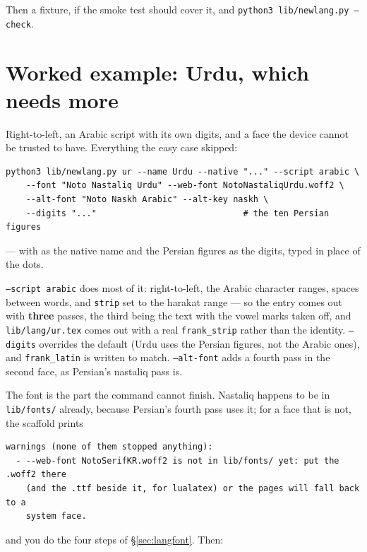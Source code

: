 \documentclass[11pt,oneside]{report}
\newcommand{\pw}[1]{\babelsublr{\mbox{\foreignlanguage{persian}{#1}}}}
\newcommand{\aw}[1]{\babelsublr{\mbox{\foreignlanguage{arabic}{#1}}}}
\newcommand{\file}[1]{\texttt{#1}}
\begin{document}
Then a fixture, if the smoke test should cover it, and
\file{python3 lib/newlang.py --check}.

\section{Worked example: Urdu, which needs more}

Right-to-left, an Arabic script with its own digits, and a face the device
cannot be trusted to have. Everything the easy case skipped:

\begin{lstlisting}
python3 lib/newlang.py ur --name Urdu --native "..." --script arabic \
    --font "Noto Nastaliq Urdu" --web-font NotoNastaliqUrdu.woff2 \
    --alt-font "Noto Naskh Arabic" --alt-key naskh \
    --digits "..."                             # the ten Persian figures
\end{lstlisting}

\noindent --- with \aw{اردو} as the native name and the Persian figures
\pw{۰۱۲۳۴۵۶۷۸۹} as the digits, typed in place of the dots.

\texttt{--script arabic} does most of it: right-to-left, the Arabic
character ranges, spaces between words, and \texttt{strip} set to the harakat
range --- so the entry comes out with \textbf{three} passes, the third being
the text with the vowel marks taken off, and \file{lib/lang/ur.tex} comes out
with a real \texttt{frank\_strip} rather than the identity. \texttt{--digits}
overrides the default (Urdu uses the Persian figures, not the Arabic ones),
and \texttt{frank\_latin} is written to match. \texttt{--alt-font} adds a
fourth pass in the second face, as Persian's nastaliq pass is.

The font is the part the command cannot finish. Nastaliq happens to be in
\file{lib/fonts/} already, because Persian's fourth pass uses it; for a face
that is not, the scaffold prints

\begin{lstlisting}
warnings (none of them stopped anything):
  - --web-font NotoSerifKR.woff2 is not in lib/fonts/ yet: put the .woff2 there
    (and the .ttf beside it, for lualatex) or the pages will fall back to a
    system face.
\end{lstlisting}

\noindent and you do the four steps of \S\ref{sec:langfont}. Then:
\end{document}
